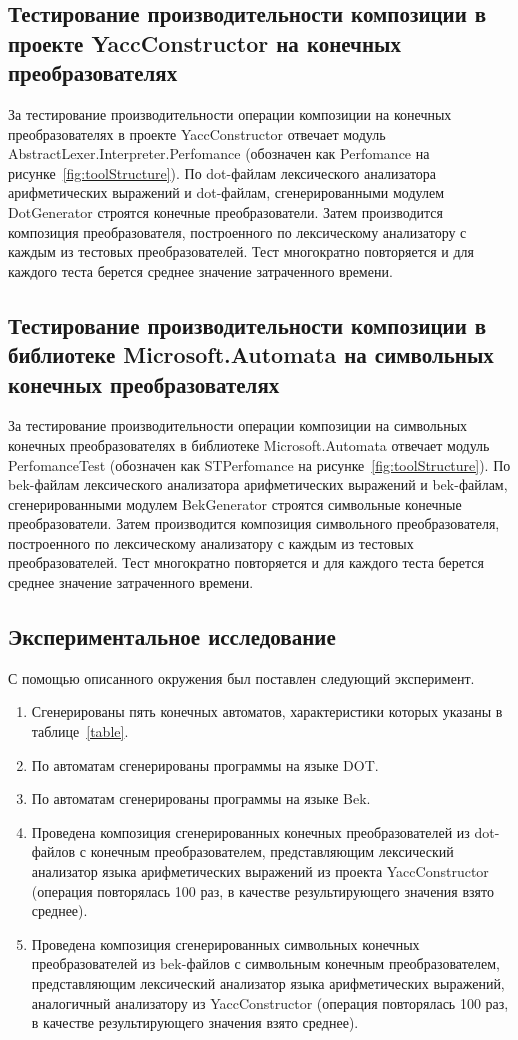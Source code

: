 \subsection{Тестирование производительности композиции в проекте YaccConstructor на конечных преобразователях}
За тестирование производительности операции композиции на конечных преобразователях в проекте YaccConstructor отвечает модуль AbstractLexer.Interpreter.Perfomance (обозначен как Perfomance на рисунке~\ref{fig:toolStructure}). По dot-файлам лексического анализатора арифметических выражений и dot-файлам, сгенерированными модулем DotGenerator строятся конечные преобразователи. Затем производится композиция преобразователя, построенного по лексическому анализатору с каждым из тестовых преобразователей. Тест многократно повторяется и для каждого теста берется среднее значение затраченного времени.

\subsection{Тестирование производительности композиции в библиотеке Microsoft.Automata на символьных конечных преобразователях}
За тестирование производительности операции композиции на символьных конечных преобразователях в библиотеке Microsoft.Automata отвечает модуль PerfomanceTest (обозначен как STPerfomance на рисунке~\ref{fig:toolStructure}). По bek-файлам лексического анализатора арифметических выражений и bek-файлам, сгенерированными модулем BekGenerator строятся символьные конечные преобразователи. Затем производится композиция символьного преобразователя, построенного по лексическому анализатору с каждым из тестовых преобразователей. Тест многократно повторяется и для каждого теста берется среднее значение затраченного времени.

\subsection{Экспериментальное исследование}
С помощью описанного окружения был поставлен следующий эксперимент.

\begin{enumerate}
\item Сгенерированы пять конечных автоматов, характеристики которых указаны в таблице~\ref{table}.
\item По автоматам сгенерированы программы на языке DOT.
\item По автоматам сгенерированы программы на языке Bek.
\item Проведена композиция сгенерированных конечных преобразователей из dot-файлов с конечным преобразователем, представляющим лексический анализатор языка арифметических выражений из проекта YaccConstructor (операция повторялась 100 раз, в качестве результирующего значения взято среднее).
\item Проведена композиция сгенерированных символьных конечных преобразователей из bek-файлов с символьным конечным преобразователем, представляющим лексический анализатор языка арифметических выражений, аналогичный анализатору из YaccConstructor (операция повторялась 100 раз, в качестве результирующего значения взято среднее).
\end{enumerate}

